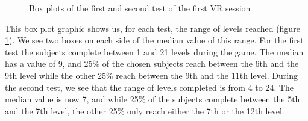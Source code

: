 \documentclass[12pt, openany, twocolumn]{article}
\begin{document}
                \begin{figure}[H]
                    \centering
                    \setlength{\fboxsep}{0pt}
                    \caption{Box plots of the first and second test of the first VR session}
                    \label{figure3}
                \end{figure}

            This box plot graphic shows us, for each test, the range of levels reached (figure \ref{figure3}).
            We see two boxes on each side of the median value of this range.
            For the first test the subjects complete between 1 and 21 levels during the game. 
            The median has a value of 9, and 25\% of the chosen subjects reach between the 6th and the 9th level while the other 25\% reach between the 9th and the 11th level.
            During the second test, we see that the range of levels completed is from 4 to 24.
            The median value is now 7, and while 25\% of the subjects complete between the 5th and the 7th level, the other 25\% only reach either the 7th or the 12th level.
            \\
\end{document}
